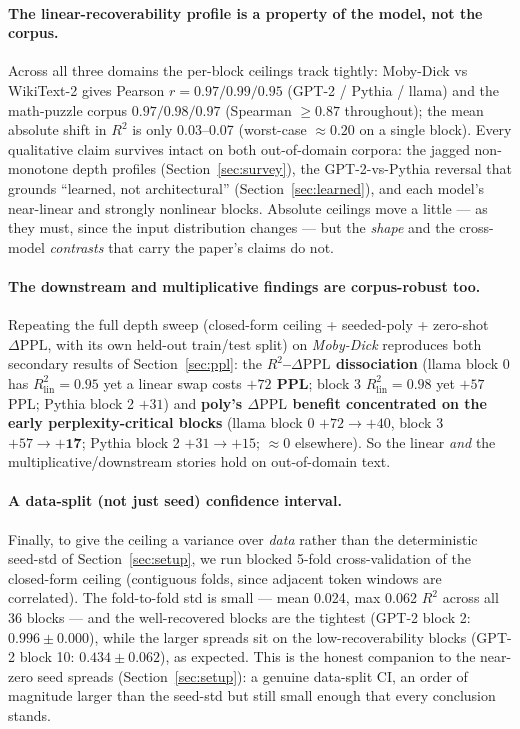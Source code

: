 \documentclass{article}
\newcommand{\Rlin}{R^2_{\mathrm{lin}}}
\newcommand{\dppl}{\Delta\mathrm{PPL}}
\begin{document}
\paragraph{The linear-recoverability profile is a property of the model, not the corpus.} Across
all three domains the per-block ceilings track tightly: Moby-Dick vs WikiText-2 gives Pearson
$r = 0.97 / 0.99 / 0.95$ (GPT-2 / Pythia / llama) and the math-puzzle corpus $0.97 / 0.98 / 0.97$
(Spearman $\ge 0.87$ throughout); the mean absolute shift in $R^2$ is only 0.03--0.07 (worst-case
$\approx 0.20$ on a single block). Every qualitative claim survives intact on both out-of-domain
corpora: the jagged non-monotone depth profiles (Section~\ref{sec:survey}), the GPT-2-vs-Pythia
reversal that grounds ``learned, not architectural'' (Section~\ref{sec:learned}), and each model's
near-linear and strongly nonlinear blocks. Absolute ceilings move a little --- as they must, since
the input distribution changes --- but the \emph{shape} and the cross-model \emph{contrasts} that
carry the paper's claims do not.

\paragraph{The downstream and multiplicative findings are corpus-robust too.} Repeating the full
depth sweep (closed-form ceiling + seeded-poly + zero-shot $\dppl$, with its own held-out
train/test split) on \emph{Moby-Dick} reproduces both secondary results of Section~\ref{sec:ppl}:
the \textbf{$R^2$--$\dppl$ dissociation} (llama block 0 has $\Rlin = 0.95$ yet a linear swap costs
\textbf{$+72$ PPL}; block 3 $\Rlin = 0.98$ yet $+57$ PPL; Pythia block 2 $+31$) and \textbf{poly's
$\dppl$ benefit concentrated on the early perplexity-critical blocks} (llama block 0 $+72\to+40$,
block 3 $+57\to\mathbf{+17}$; Pythia block 2 $+31\to+15$; $\approx 0$ elsewhere). So the linear
\emph{and} the multiplicative/downstream stories hold on out-of-domain text.

\paragraph{A data-split (not just seed) confidence interval.} Finally, to give the ceiling a
variance over \emph{data} rather than the deterministic seed-std of Section~\ref{sec:setup}, we run
blocked 5-fold cross-validation of the closed-form ceiling (contiguous folds, since adjacent token
windows are correlated). The fold-to-fold std is small --- mean 0.024, max 0.062 $R^2$ across all
36 blocks --- and the well-recovered blocks are the tightest (GPT-2 block 2: $0.996 \pm 0.000$),
while the larger spreads sit on the low-recoverability blocks (GPT-2 block 10: $0.434 \pm 0.062$),
as expected. This is the honest companion to the near-zero seed spreads (Section~\ref{sec:setup}):
a genuine data-split CI, an order of magnitude larger than the seed-std but still small enough that
every conclusion stands.
\end{document}
